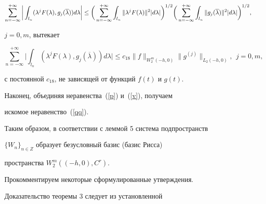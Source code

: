 $$




\sum\limits_{n=-\infty}^{+\infty}\bigg|\int_{l_n}(\lambda^jF(\lambda),


g_j(\overline{\lambda}))d\lambda\bigg|\le\\


%


\bigg(\sum\limits_{n=-\infty}^{+\infty}\int_{l_n}\|\lambda^jF(\lambda)


\|^2|d\lambda|\bigg)^{1/2}\bigg(\sum\limits_{n=-\infty}^{+\infty}\int_{l_n}\|


g_j(\overline{\lambda})\|^2|d\lambda|\bigg)^{1/2},


$$




$j=0,m$, вытекает


\begin{equation}


\label{v}


\sum\limits_{n=-\infty}^{+\infty}\bigg|\int_{l_n}(\lambda^jF(\lambda),


g_j(\overline{\lambda}))d\lambda\bigg|\le c_{18}\|f\|_{W_2^m(-h,0)}\|g^{(j)}\|


_{L_2(-h,0)},\ \ j=0,m,


\end{equation}


с постоянной $c_{18}$, не зависящей от функций $f(t)$ и $g(t)$.





Наконец, объединяя неравенства~(\ref{p}) и~(\ref{v}), получаем


искомое неравенство~(\ref{qq}).





Таким образом, в соответствии с леммой 5 система подпространств


$\{W_n\}_{n\in Z}$ образует безусловный базис (базис Рисса)


пространства $W_2^m((-h,0),C^r)$.








Прокомментируем некоторые сформулированные утверждения.





Доказательство теоремы 3 следует из установленной



